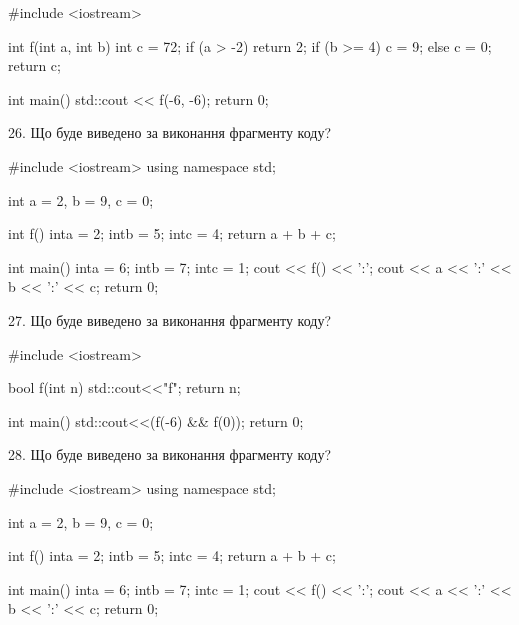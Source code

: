 \documentclass[11pt]{article}
\begin{document}
#include <iostream>

int f(int a, int b){
    int c = 72;
    if (a > -2)
        return 2;
    if (b >= 4)
         c = 9;
    else 
        c = 0;
    return c;
}

int main(){
    std::cout << f(-6, -6);
    return 0;
}

26. Що буде виведено за виконання фрагменту коду?

#include <iostream>
using namespace std;

int a = 2, b = 9, c = 0;

int f(){
    inta = 2;
    intb = 5;
    intc = 4;
    return a + b + c;
}

int main(){
    inta = 6;
    intb = 7;
    intc = 1;
    cout << f() << ':';
    cout << a << ':' << b << ':' << c;
    return 0;
}

27. Що буде виведено за виконання фрагменту коду?

#include <iostream>

bool f(int n){
    std::cout<<"f";
    return n;
}

int main(){
    std::cout<<(f(-6) && f(0));
    return 0;
}

28. Що буде виведено за виконання фрагменту коду?

#include <iostream>
using namespace std;

int a = 2, b = 9, c = 0;

int f(){
    inta = 2;
    intb = 5;
    intc = 4;
    return a + b + c;
}

int main(){
    inta = 6;
    intb = 7;
    intc = 1;
    cout << f() << ':';
    cout << a << ':' << b << ':' << c;
    return 0;
}





























\newpage
\end{document}
